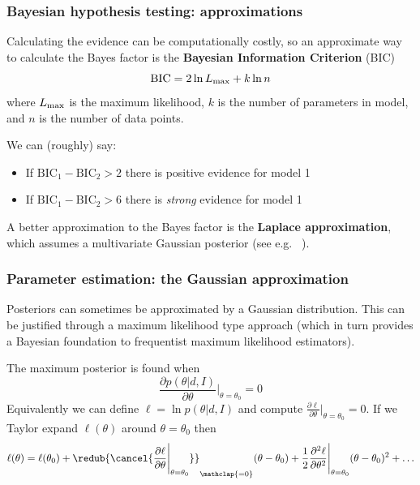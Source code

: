 \begin{frame}

\frametitle{Bayesian hypothesis testing: approximations}
\label{bayesianhypothesistesting:approximations}

Calculating the evidence can be computationally costly, so an approximate way to calculate the Bayes factor is
the \textbf{Bayesian Information Criterion} (BIC) ~\citep{Schwarz}
\[
\text{BIC} = 2\ln{L_{\rm max}} + k\ln{n}
\]
where $L_{\rm max}$ is the maximum likelihood, $k$ is the number of parameters in model, and $n$ is
the number of data points.

We can (roughly) say:

\begin{itemize}
\item If $\text{BIC}_1 - \text{BIC}_2 > 2$ there is positive evidence for model 1

\item If $\text{BIC}_1 - \text{BIC}_2 > 6$ there is \emph{strong} evidence for model 1

\end{itemize}

A better approximation to the Bayes factor is the \textbf{Laplace approximation}, which assumes a multivariate Gaussian posterior (see e.g. ~\citep{Trotta}).

\end{frame}

\begin{frame}

\frametitle{Parameter estimation: the Gaussian approximation}
\label{parameterestimation:thegaussianapproximation}

Posteriors can sometimes be approximated by a Gaussian distribution. This can be justified
through a maximum likelihood type approach (which in turn provides a Bayesian foundation to
frequentist maximum likelihood estimators).

The maximum posterior is found when
\[
\frac{\partial p(\theta|d,I)}{\partial \theta}\Big|_{\theta=\theta_0} = 0
\]
Equivalently we can define $\ell = \ln{p(\theta|d,I)}$ and compute $\frac{\partial \ell}{\partial \theta}\big|_{\theta=\theta_0} = 0$. If we Taylor expand $\ell(\theta)$ around $\theta=\theta_0$ then
\[
\ell(\theta) = \ell(\theta_0) + \redub{\cancel{\frac{\partial \ell}{\partial \theta}\Bigg|_{\theta=\theta_0}}}_{\mathclap{\text{=0}}}(\theta-\theta_0) + \frac{1}{2}\frac{\partial^2 \ell}{\partial \theta^2}\Bigg|_{\theta=\theta_0}(\theta-\theta_0)^2 + \ldots
\]

\end{frame}

